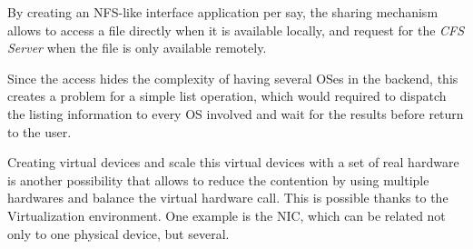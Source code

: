 \documentclass[journal]{IEEEtran}
\begin{document}
\begin{itemize}
	By creating an NFS-like interface application per say, the sharing mechanism allows to access a file directly when it is available locally, and request for the \emph{CFS Server} when the file is only available remotely.

	Since the access hides the complexity of having several OSes in the backend, this creates a problem for a simple list operation, which would required to dispatch the listing information to every OS involved and wait for the results before return to the user.
	
	Creating virtual devices and scale this virtual devices with a set of real hardware is another possibility that allows to reduce the contention by using multiple hardwares and balance the virtual hardware call. This is possible thanks to the Virtualization environment. One example is the NIC, which can be related not only to one physical device, but several. 
	
	
	
	

\end{itemize}
\end{document}
